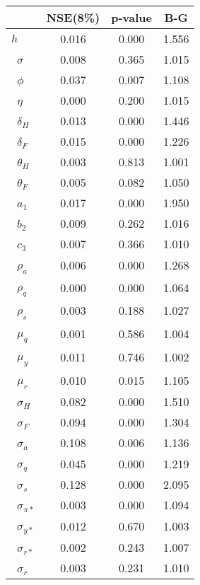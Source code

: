 \begin{tiny}\begin{tabular}{lccc}
\hline
&\textbf{NSE(8\%)}&\textbf{p-value}&\textbf{B-G}\\\hline
\textbf{$ h             $}&0.016&0.000&1.556\\\
\textbf{$ \sigma        $}&0.008&0.365&1.015\\\
\textbf{$ \phi          $}&0.037&0.007&1.108\\\
\textbf{$ \eta          $}&0.000&0.200&1.015\\\
\textbf{$ \delta_{H}    $}&0.013&0.000&1.446\\\
\textbf{$ \delta_{F}    $}&0.015&0.000&1.226\\\
\textbf{$ \theta_{H}    $}&0.003&0.813&1.001\\\
\textbf{$ \theta_{F}    $}&0.005&0.082&1.050\\\
\textbf{$ a_{1}         $}&0.017&0.000&1.950\\\
\textbf{$ b_{2}         $}&0.009&0.262&1.016\\\
\textbf{$ c_{3}         $}&0.007&0.366&1.010\\\
\textbf{$ \rho_{a}      $}&0.006&0.000&1.268\\\
\textbf{$ \rho_{q}      $}&0.000&0.000&1.064\\\
\textbf{$ \rho_{s}      $}&0.003&0.188&1.027\\\
\textbf{$ \mu_{q}       $}&0.001&0.586&1.004\\\
\textbf{$ \mu_{y}       $}&0.011&0.746&1.002\\\
\textbf{$ \mu_{r}       $}&0.010&0.015&1.105\\\
\textbf{$ \sigma_{H}    $}&0.082&0.000&1.510\\\
\textbf{$ \sigma_{F}    $}&0.094&0.000&1.304\\\
\textbf{$ \sigma_{a}    $}&0.108&0.006&1.136\\\
\textbf{$ \sigma_{q}    $}&0.045&0.000&1.219\\\
\textbf{$ \sigma_{s}    $}&0.128&0.000&2.095\\\
\textbf{$ \sigma_{\pi*} $}&0.003&0.000&1.094\\\
\textbf{$ \sigma_{y*}   $}&0.012&0.670&1.003\\\
\textbf{$ \sigma_{r*}   $}&0.002&0.243&1.007\\\
\textbf{$ \sigma_{r}    $}&0.003&0.231&1.010\\\hline
\end{tabular}
\end{tiny}